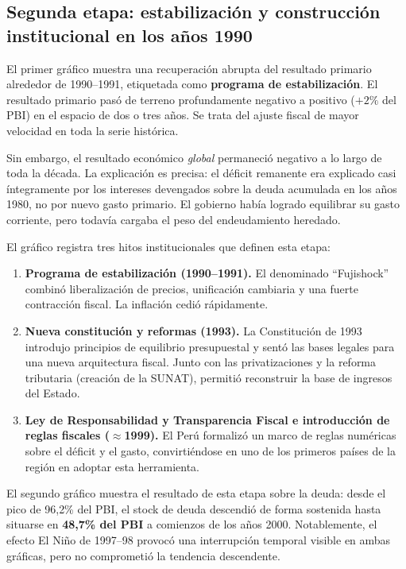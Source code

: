 \documentclass[12pt, a4paper]{article}
\newcommand{\emp}[1]{\textbf{#1}}
\begin{document}
\subsection{Segunda etapa: estabilización y construcción
            institucional en los años 1990}

El primer gráfico muestra una recuperación abrupta del resultado primario
alrededor de 1990--1991, etiquetada como \emp{programa de estabilización}.
El resultado primario pasó de terreno profundamente negativo a positivo
($+2\%$ del PBI) en el espacio de dos o tres años. Se trata del ajuste fiscal
de mayor velocidad en toda la serie histórica.

Sin embargo, el resultado económico \emph{global} permaneció negativo a lo
largo de toda la década. La explicación es precisa: el déficit remanente era
explicado casi íntegramente por los intereses devengados sobre la deuda
acumulada en los años 1980, no por nuevo gasto primario. El gobierno había
logrado equilibrar su gasto corriente, pero todavía cargaba el peso del
endeudamiento heredado.

El gráfico registra tres hitos institucionales que definen esta etapa:

\begin{enumerate}[leftmargin=1.5em]
    \item \emp{Programa de estabilización (1990--1991).} El denominado
          ``Fujishock'' combinó liberalización de precios, unificación
          cambiaria y una fuerte contracción fiscal. La inflación cedió
          rápidamente.
    \item \emp{Nueva constitución y reformas (1993).} La Constitución de 1993
          introdujo principios de equilibrio presupuestal y sentó las bases
          legales para una nueva arquitectura fiscal. Junto con las
          privatizaciones y la reforma tributaria (creación de la SUNAT),
          permitió reconstruir la base de ingresos del Estado.
    \item \emp{Ley de Responsabilidad y Transparencia Fiscal e introducción
          de reglas fiscales ($\approx$1999).} El Perú formalizó un marco de
          reglas numéricas sobre el déficit y el gasto, convirtiéndose en uno
          de los primeros países de la región en adoptar esta herramienta.
\end{enumerate}

El segundo gráfico muestra el resultado de esta etapa sobre la deuda: desde
el pico de 96{,}2\% del PBI, el stock de deuda descendió de forma sostenida
hasta situarse en \emp{48{,}7\% del PBI} a comienzos de los años 2000.
Notablemente, el efecto El Niño de 1997--98 provocó una interrupción temporal
visible en ambas gráficas, pero no comprometió la tendencia descendente.
\end{document}
